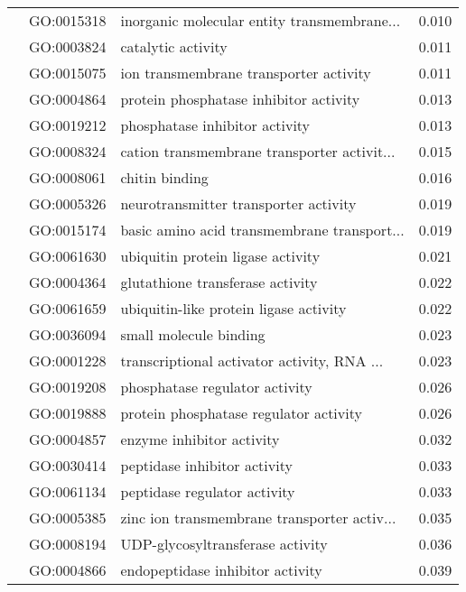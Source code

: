 \begin{longtable}{lllr}
   & GO:0015318 &  inorganic molecular entity transmembrane... &         0.010 \\
   & GO:0003824 &                           catalytic activity &         0.011 \\
   & GO:0015075 &       ion transmembrane transporter activity &         0.011 \\
   & GO:0004864 &       protein phosphatase inhibitor activity &         0.013 \\
   & GO:0019212 &               phosphatase inhibitor activity &         0.013 \\
   & GO:0008324 &  cation transmembrane transporter activit... &         0.015 \\
   & GO:0008061 &                               chitin binding &         0.016 \\
   & GO:0005326 &        neurotransmitter transporter activity &         0.019 \\
   & GO:0015174 &  basic amino acid transmembrane transport... &         0.019 \\
   & GO:0061630 &            ubiquitin protein ligase activity &         0.021 \\
   & GO:0004364 &             glutathione transferase activity &         0.022 \\
   & GO:0061659 &       ubiquitin-like protein ligase activity &         0.022 \\
   & GO:0036094 &                       small molecule binding &         0.023 \\
   & GO:0001228 &  transcriptional activator activity, RNA ... &         0.023 \\
   & GO:0019208 &               phosphatase regulator activity &         0.026 \\
   & GO:0019888 &       protein phosphatase regulator activity &         0.026 \\
   & GO:0004857 &                    enzyme inhibitor activity &         0.032 \\
   & GO:0030414 &                 peptidase inhibitor activity &         0.033 \\
   & GO:0061134 &                 peptidase regulator activity &         0.033 \\
   & GO:0005385 &  zinc ion transmembrane transporter activ... &         0.035 \\
   & GO:0008194 &             UDP-glycosyltransferase activity &         0.036 \\
   & GO:0004866 &             endopeptidase inhibitor activity &         0.039 \\

\end{longtable}
